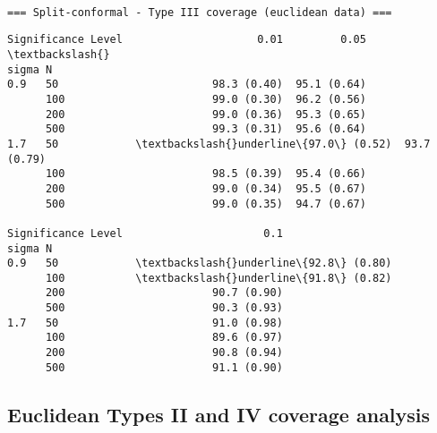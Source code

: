 \documentclass[11pt]{article}
\begin{document}
    
    \begin{Verbatim}[commandchars=\\\{\}]

=== Split-conformal - Type III coverage (euclidean data) ===
    \end{Verbatim}

    
    \begin{Verbatim}[commandchars=\\\{\}]
Significance Level                     0.01         0.05  \textbackslash{}
sigma N                                                    
0.9   50                        98.3 (0.40)  95.1 (0.64)   
      100                       99.0 (0.30)  96.2 (0.56)   
      200                       99.0 (0.36)  95.3 (0.65)   
      500                       99.3 (0.31)  95.6 (0.64)   
1.7   50            \textbackslash{}underline\{97.0\} (0.52)  93.7 (0.79)   
      100                       98.5 (0.39)  95.4 (0.66)   
      200                       99.0 (0.34)  95.5 (0.67)   
      500                       99.0 (0.35)  94.7 (0.67)   

Significance Level                      0.1  
sigma N                                      
0.9   50            \textbackslash{}underline\{92.8\} (0.80)  
      100           \textbackslash{}underline\{91.8\} (0.82)  
      200                       90.7 (0.90)  
      500                       90.3 (0.93)  
1.7   50                        91.0 (0.98)  
      100                       89.6 (0.97)  
      200                       90.8 (0.94)  
      500                       91.1 (0.90)  
    \end{Verbatim}

    
    \subsection{Euclidean Types II and IV coverage
analysis}\label{euclidean-types-ii-and-iv-coverage-analysis}
\end{document}
